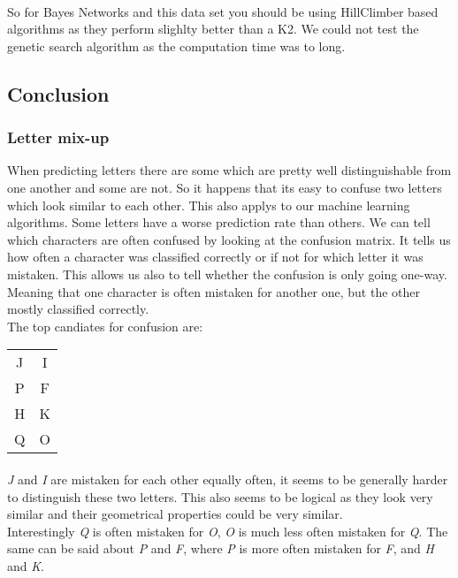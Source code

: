 \documentclass{article}
\begin{document}
\paragraph{}So for Bayes Networks and this data set you should be using HillClimber based algorithms as they perform slighlty better than a K2. We could not test the genetic search algorithm as the computation time was to long.

\subsection{Conclusion}
\subsubsection{Letter mix-up}
When predicting letters there are some which are pretty well distinguishable from one another and some are not. So it happens that its easy to confuse two letters which look similar to each other. This also applys to our machine learning algorithms. Some letters have a worse prediction rate than others. We can tell which characters are often confused by looking at the confusion matrix. It tells us how often a character was classified correctly or if not for which letter it was mistaken. This allows us also to tell whether the confusion is only going one-way. Meaning that one character is often mistaken for another one, but the other mostly classified correctly.\\
The top candiates for confusion are:\\
\begin{center}
\begin{tabular}{  c |  c  }
J & I \\
P & F \\
H & K \\
Q & O \\
\end{tabular}
\end{center}
\paragraph{}\emph{J} and \emph{I} are mistaken for each other equally often, it seems to be generally harder to distinguish these two letters. This also seems to be logical as they look very similar and their geometrical properties could be very similar.\\
Interestingly \emph{Q} is often mistaken for \emph{O}, \emph{O} is much less often mistaken for \emph{Q}. The same can be said about \emph{P} and \emph{F}, where \emph{P} is more often mistaken for \emph{F}, and \emph{H} and \emph{K}.
\end{document}
